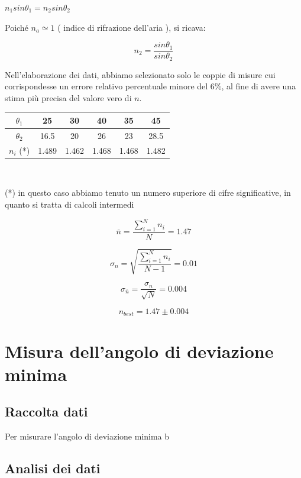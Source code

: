 \documentclass[a4paper,10pt]{report}
\begin{document}
\begin{center}
$n_1 sin\theta_1 = n_2 sin\theta_2$
\end{center}

Poiché $n_a \simeq1 $ ( indice di rifrazione dell'aria ), si ricava:

$$n_2 = \frac{sin\theta_1}{sin\theta_2}$$

Nell'elaborazione dei dati, abbiamo selezionato solo le coppie di misure cui corrispondesse un errore relativo percentuale minore del 6\%, al fine di avere una stima più precisa del valore vero di $n$.\\
\begin{center}


\begin{tabular}{c|c|c|c|c|c}
\textbf{$\theta_1$} & 25 & 30 & 40 & 35 & 45\\
\midrule
\textbf{$\theta_2$} & 16.5 & 20 & 26 & 23 & 28.5\\
\midrule
\textbf{$n_i$} (*) & 1.489 & 1.462 & 1.468 & 1.468 & 1.482\\
\end{tabular}\\

\end{center}
(*) in questo caso abbiamo tenuto un numero superiore di cifre significative, in quanto si tratta di calcoli intermedi 

$$\overline{n} = \frac{\displaystyle\sum\limits_{i=1}^N n_i}{N} = 1.47$$

$$\sigma_n = \sqrt{\frac{\displaystyle\sum\limits_{i=1}^N n_i}{N-1}} = 0.01$$

$$\sigma_{\overline{n}} = \frac{\sigma_n}{\sqrt{N}} = 0.004$$

$$n_{best} = 1.47 \pm 0.004 $$


\section{Misura dell'angolo di deviazione minima}
\subsection{Raccolta dati}
Per misurare l'angolo di deviazione minima b
\subsection{Analisi dei dati}
\end{document}
